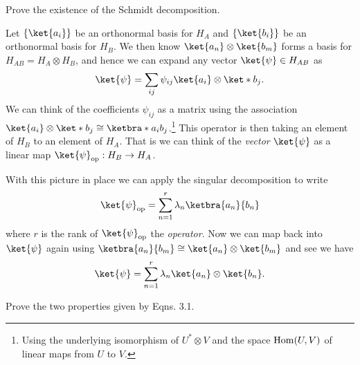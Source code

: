 \documentclass[
	pages,
	boxes,
	color=RoyalPurple
]{homework}
\makeatletter
\numberwithin{tcb@cnt@prob}{section}
\makeatother
\begin{document}

\begin{problem}
Prove the existence of the Schmidt decomposition.
\end{problem}

\begin{solution}
    Let $\{\ket{a_i}\}$ be an orthonormal basis for $H_A$ and $\{\ket{b_i}\}$ be an orthonormal basis for $H_B$. We then know $\ket{a_n}\otimes \ket{b_m}$ forms a basis for $H_{AB} = H_A\otimes H_B$, and hence we can expand any vector $\ket{\psi}\in H_{AB}$ as
    \begin{equation*}
        \ket{\psi} = \sum_{ij}\psi_{ij}\ket{a_i}\otimes \ket*{b_j}.
    \end{equation*}
    We can think of the coefficients $\psi_{ij}$ as a matrix using the association $\ket{a_i}\otimes\ket*{b_j}\cong \ketbra*{a_i}{b_j}$.\footnote{Using the underlying isomorphism of $U^*\otimes V$ and the space $\operatorname{Hom}(U, V)$ of linear maps from $U$ to $V$.} This operator is then taking an element of $H_B$ to an element of $H_A$. That is we can think of the \emph{vector} $\ket{\psi}$ as a linear map $\ket{\psi}_\mathrm{op}: H_B\to H_A$.

    With this picture in place we can apply the singular decomposition to write
    \begin{equation*}
        \ket{\psi}_\mathrm{op} = \sum_{n = 1}^r\lambda_n\ketbra{a_n}{b_n}
    \end{equation*}
    where $r$ is the rank of $\ket{\psi}_\mathrm{op}$ the \emph{operator}. Now we can map back into $\ket{\psi}$ again using $\ketbra{a_n}{b_m}\cong \ket{a_n}\otimes \ket{b_m}$ and see we have
    \begin{equation*}
        \ket{\psi} = \sum_{n = 1}^r\lambda_n\ket{a_n}\otimes \ket{b_n}.
    \end{equation*}
\end{solution}

\setcounter{section}{3}

\begin{problem}
Prove the two properties given by Eqns. 3.1.
\end{problem}
\end{document}
